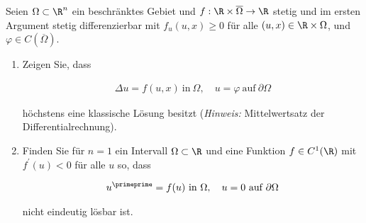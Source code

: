 
\begin{exercise}

Seien $\Omega \subset \R^n$ ein beschränktes Gebiet und $f:\R \times \overline{\Omega} \to \R$ stetig und im ersten Argument stetig differenzierbar mit $f_u(u, x) \geq 0$ für alle $(u, x) \in \R \times \Omega$, und $\varphi \in C(\overline{\Omega})$.

\begin{enumerate}[label = (\alph*)]

  \item Zeigen Sie, dass

  \begin{align*}
    \Delta u = f(u, x) ~\text{in}~ \Omega,
    \quad
    u = \varphi ~\text{auf}~ \partial \Omega
  \end{align*}

  höchstens eine klassische Lösung besitzt
  (\textit{Hinweis:} Mittelwertsatz der Differentialrechnung).

  \item Finden Sie für $n = 1$ ein Intervall $\Omega \subset \R$ und eine Funktion $f \in C^1(\R)$ mit $f^{\prime}(u) < 0$ für alle $u$ so, dass

  \begin{align*}
    u^\primeprime = f(u) ~\text{in}~ \Omega,
    \quad
    u = 0 ~\text{auf}~ \partial \Omega
  \end{align*}

  nicht eindeutig lösbar ist.

\end{enumerate}

\end{exercise}


